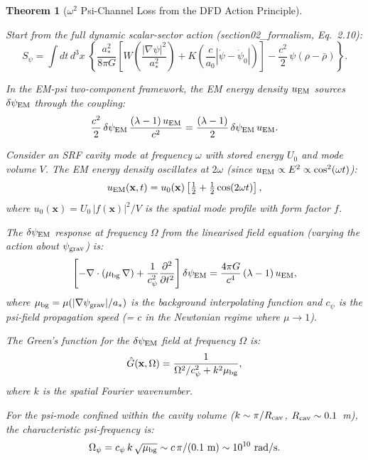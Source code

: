\documentclass[11pt]{article}
\newcommand{\Opsi}{\Omega_\psi}
\newcommand{\half}{\tfrac{1}{2}}
\newcommand{\psigrav}{\psi_{\rm grav}}
\newcommand{\dpsiEM}{\delta\psi_{\rm EM}}
\newtheorem{theorem}{Theorem}[section]
\theoremstyle{definition}
\theoremstyle{remark}
\begin{document}
\begin{theorem}[$\omega^2$ Psi-Channel Loss from the DFD Action Principle]
\label{thm:omega2}

Start from the full dynamic scalar-sector action (section02\_formalism,
Eq.~2.10):
\begin{equation}
S_\psi = \int dt\,d^3x\;\left\{
  \frac{a_*^2}{8\pi G}\left[
    W\!\left(\frac{|\nabla\psi|^2}{a_*^2}\right)
    + K\!\left(\frac{c}{a_0}|\dot\psi{-}\dot\psi_0|\right)
  \right]
  - \frac{c^2}{2}\,\psi(\rho - \bar\rho)
\right\}.
\label{eq:action_full}
\end{equation}

In the EM-psi two-component framework, the EM energy density $u_{\rm EM}$
sources $\dpsiEM$ through the coupling:
\begin{equation}
\frac{c^2}{2}\,\dpsiEM\,\frac{(\lambda - 1)\,u_{\rm EM}}{c^2}
= \frac{(\lambda-1)}{2}\,\dpsiEM\,u_{\rm EM}.
\label{eq:EM_coupling}
\end{equation}

Consider an SRF cavity mode at frequency $\omega$ with stored energy
$U_0$ and mode volume $V$. The EM energy density oscillates at $2\omega$
(since $u_{\rm EM} \propto E^2 \propto \cos^2(\omega t)$):
\begin{equation}
u_{\rm EM}(\mathbf{x}, t) = u_0(\mathbf{x})\left[\half + \half\cos(2\omega t)\right],
\end{equation}
where $u_0(\mathbf{x}) = U_0\,|f(\mathbf{x})|^2/V$ is the spatial
mode profile with form factor $f$.

The $\dpsiEM$ response at frequency $\Omega$ from the linearised
field equation (varying the action about $\psigrav$) is:
\begin{equation}
\left[-\nabla\cdot(\mu_{\rm bg}\,\nabla) + \frac{1}{c_\psi^2}\frac{\partial^2}{\partial t^2}\right]\dpsiEM
= \frac{4\pi G}{c^4}\,(\lambda - 1)\,u_{\rm EM},
\label{eq:linearised}
\end{equation}
where $\mu_{\rm bg} = \mu(|\nabla\psigrav|/a_*)$ is the background
interpolating function and $c_\psi$ is the psi-field propagation speed
(= $c$ in the Newtonian regime where $\mu \to 1$).

The Green's function for the $\dpsiEM$ field at frequency $\Omega$ is:
\begin{equation}
\hat{G}(\mathbf{x}, \Omega) = \frac{1}{\Omega^2/c_\psi^2 + k^2\mu_{\rm bg}},
\end{equation}
where $k$ is the spatial Fourier wavenumber.

For the psi-mode confined within the cavity volume ($k \sim \pi/R_{\rm cav}$,
$R_{\rm cav} \sim 0.1$~m), the characteristic psi-frequency is:
\begin{equation}
\Opsi = c_\psi\,k\,\sqrt{\mu_{\rm bg}} \sim c\,\pi/(0.1~\text{m})
\sim 10^{10}~\text{rad/s}.
\end{equation}


\end{theorem}
\end{document}
